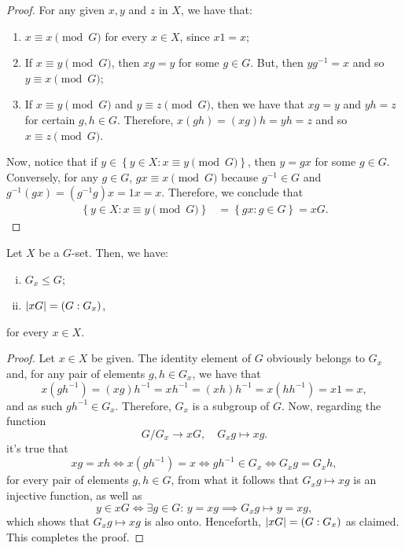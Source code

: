 \begin{proof}
  For any given \(x,y\) and \(z\) in \(X\), we have that:
  \begin{enumerate}
    \item
      \(x\equiv{x}\pmod{G}\) for every \(x\in{X}\), since \(x1=x\);
    \item
      If \(x\equiv{y}\pmod{G}\), then \(xg=y\) for some \(g\in{G}\). But, then
      \(yg^{-1}=x\) and so \(y\equiv{x}\pmod{G}\);
    \item
      If \(x\equiv{y}\pmod{G}\) and \(y\equiv{z}\pmod{G}\), then we have that
      \(xg=y\) and \(yh=z\) for certain \(g,h\in{G}\). Therefore,
      \(x(gh)=(xg)h=yh=z\) and so \(x\equiv{z}\pmod{G}\).
  \end{enumerate}
  Now, notice that if \(y\in\left\{y\in{X}:x\equiv{y}\pmod{G}\right\}\), then
  \(y=gx\) for some \(g\in{G}\). Conversely, for any \(g\in{G}\),
  \(gx\equiv{x}\pmod{G}\) because \(g^{-1}\in{G}\) and
  \(g^{-1}(gx)=(g^{-1}g)x=1x=x\). Therefore, we conclude that
  \begin{align*}
    \left\{y\in{X}:x\equiv{y}\pmod{G}\right\}
    &=
    \left\{gx:g\in{G}\right\}
    =xG.
  \end{align*}
\end{proof}

\begin{proposition}\label{prop:cardinality-of-orbits}
  Let \(X\) be a \(G\)-set. Then, we have:
  \begin{enumerate}[i.]
    \item
      \(G_{x}\leqslant{G}\);
    \item
      \(\lvert xG\rvert=(G:G_{x})\),
  \end{enumerate}
  for every \(x\in{X}\).
\end{proposition}

\begin{proof}
  Let \(x\in{X}\) be given. The identity element of \(G\) obviously belongs to
  \(G_{x}\) and, for any pair of elements \(g,h\in{G_{x}}\), we have that
  \[
    x(gh^{-1})=(xg)h^{-1}=xh^{-1}=(xh)h^{-1}=x(hh^{-1})=x1=x,
  \]
  and as such \(gh^{-1}\in{G_{x}}\). Therefore, \(G_{x}\) is a subgroup of
  \(G\). Now, regarding the function
  \[
    G/G_{x}\to{xG},
    \quad
    G_{x}g\mapsto{xg}.
  \]
  it's true that
  \[
    xg=xh
    \iff
    x(gh^{-1})=x
    \iff
    gh^{-1}\in{G_{x}}
    \iff
    G_{x}g=G_{x}h,
  \]
  for every pair of elements \(g,h\in{G}\), from what it follows that
  \(G_{x}g\mapsto{xg}\) is an injective function, as well as
  \[
    y\in{xG}
    \iff
    \exists{g\in{G}}:\,
    y=xg
    \implies
    G_{x}g\mapsto{y=xg},
  \]
  which shows that \(G_{x}g\mapsto{xg}\) is also onto. Henceforth,
  \(\lvert xG\rvert=(G:G_{x})\) as claimed. This completes the proof.
\end{proof}

